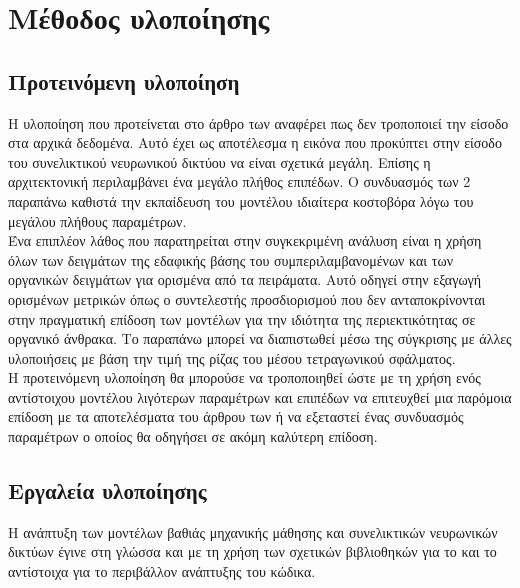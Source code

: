 \chapter{Μέθοδος υλοποίησης}
\label{ch:implementation_method}

\section{Προτεινόμενη υλοποίηση}
Η υλοποίηση που προτείνεται στο άρθρο των \cite{padarian_lucas_soil} αναφέρει πως δεν τροποποιεί την είσοδο στα αρχικά δεδομένα. Αυτό έχει ως αποτέλεσμα η εικόνα που προκύπτει στην είσοδο του συνελικτικού νευρωνικού δικτύου να είναι σχετικά μεγάλη. Επίσης η αρχιτεκτονική περιλαμβάνει ένα μεγάλο πλήθος επιπέδων. Ο συνδυασμός των 2 παραπάνω καθιστά την εκπαίδευση του μοντέλου ιδιαίτερα κοστοβόρα λόγω του μεγάλου πλήθους παραμέτρων.\\

Ένα επιπλέον λάθος που παρατηρείται στην συγκεκριμένη ανάλυση είναι η χρήση όλων των δειγμάτων της εδαφικής βάσης του  συμπεριλαμβανομένων και των οργανικών δειγμάτων για ορισμένα από τα πειράματα. Αυτό οδηγεί στην εξαγωγή ορισμένων μετρικών όπως ο συντελεστής προσδιορισμού που δεν ανταποκρίνονται στην πραγματική επίδοση των μοντέλων για την ιδιότητα της περιεκτικότητας σε οργανικό άνθρακα. Το παραπάνω μπορεί να διαπιστωθεί μέσω της σύγκρισης με άλλες υλοποιήσεις με βάση την τιμή της ρίζας του μέσου τετραγωνικού σφάλματος.\\

Η προτεινόμενη υλοποίηση θα μπορούσε να τροποποιηθεί ώστε με τη χρήση ενός αντίστοιχου μοντέλου λιγότερων παραμέτρων και επιπέδων να επιτευχθεί μια παρόμοια επίδοση με τα αποτελέσματα του άρθρου των  ή να εξεταστεί ένας συνδυασμός παραμέτρων ο οποίος θα οδηγήσει σε ακόμη καλύτερη επίδοση.

\section{Εργαλεία υλοποίησης}
Η ανάπτυξη των μοντέλων βαθιάς μηχανικής μάθησης και συνελικτικών νευρωνικών δικτύων έγινε στη γλώσσα  και με τη χρήση των σχετικών βιβλιοθηκών  για το  και το  αντίστοιχα για το περιβάλλον ανάπτυξης του κώδικα.

